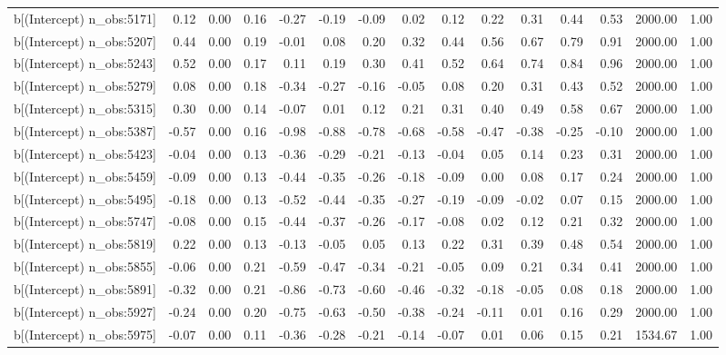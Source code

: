 \begin{table}[ht]
\begin{tabular}{rrrrrrrrrrrrrrr}
  b[(Intercept) n\_obs:5171] & 0.12 & 0.00 & 0.16 & -0.27 & -0.19 & -0.09 & 0.02 & 0.12 & 0.22 & 0.31 & 0.44 & 0.53 & 2000.00 & 1.00 \\ 
  b[(Intercept) n\_obs:5207] & 0.44 & 0.00 & 0.19 & -0.01 & 0.08 & 0.20 & 0.32 & 0.44 & 0.56 & 0.67 & 0.79 & 0.91 & 2000.00 & 1.00 \\ 
  b[(Intercept) n\_obs:5243] & 0.52 & 0.00 & 0.17 & 0.11 & 0.19 & 0.30 & 0.41 & 0.52 & 0.64 & 0.74 & 0.84 & 0.96 & 2000.00 & 1.00 \\ 
  b[(Intercept) n\_obs:5279] & 0.08 & 0.00 & 0.18 & -0.34 & -0.27 & -0.16 & -0.05 & 0.08 & 0.20 & 0.31 & 0.43 & 0.52 & 2000.00 & 1.00 \\ 
  b[(Intercept) n\_obs:5315] & 0.30 & 0.00 & 0.14 & -0.07 & 0.01 & 0.12 & 0.21 & 0.31 & 0.40 & 0.49 & 0.58 & 0.67 & 2000.00 & 1.00 \\ 
  b[(Intercept) n\_obs:5387] & -0.57 & 0.00 & 0.16 & -0.98 & -0.88 & -0.78 & -0.68 & -0.58 & -0.47 & -0.38 & -0.25 & -0.10 & 2000.00 & 1.00 \\ 
  b[(Intercept) n\_obs:5423] & -0.04 & 0.00 & 0.13 & -0.36 & -0.29 & -0.21 & -0.13 & -0.04 & 0.05 & 0.14 & 0.23 & 0.31 & 2000.00 & 1.00 \\ 
  b[(Intercept) n\_obs:5459] & -0.09 & 0.00 & 0.13 & -0.44 & -0.35 & -0.26 & -0.18 & -0.09 & 0.00 & 0.08 & 0.17 & 0.24 & 2000.00 & 1.00 \\ 
  b[(Intercept) n\_obs:5495] & -0.18 & 0.00 & 0.13 & -0.52 & -0.44 & -0.35 & -0.27 & -0.19 & -0.09 & -0.02 & 0.07 & 0.15 & 2000.00 & 1.00 \\ 
  b[(Intercept) n\_obs:5747] & -0.08 & 0.00 & 0.15 & -0.44 & -0.37 & -0.26 & -0.17 & -0.08 & 0.02 & 0.12 & 0.21 & 0.32 & 2000.00 & 1.00 \\ 
  b[(Intercept) n\_obs:5819] & 0.22 & 0.00 & 0.13 & -0.13 & -0.05 & 0.05 & 0.13 & 0.22 & 0.31 & 0.39 & 0.48 & 0.54 & 2000.00 & 1.00 \\ 
  b[(Intercept) n\_obs:5855] & -0.06 & 0.00 & 0.21 & -0.59 & -0.47 & -0.34 & -0.21 & -0.05 & 0.09 & 0.21 & 0.34 & 0.41 & 2000.00 & 1.00 \\ 
  b[(Intercept) n\_obs:5891] & -0.32 & 0.00 & 0.21 & -0.86 & -0.73 & -0.60 & -0.46 & -0.32 & -0.18 & -0.05 & 0.08 & 0.18 & 2000.00 & 1.00 \\ 
  b[(Intercept) n\_obs:5927] & -0.24 & 0.00 & 0.20 & -0.75 & -0.63 & -0.50 & -0.38 & -0.24 & -0.11 & 0.01 & 0.16 & 0.29 & 2000.00 & 1.00 \\ 
  b[(Intercept) n\_obs:5975] & -0.07 & 0.00 & 0.11 & -0.36 & -0.28 & -0.21 & -0.14 & -0.07 & 0.01 & 0.06 & 0.15 & 0.21 & 1534.67 & 1.00 \\ 

\end{tabular}
\end{table}
